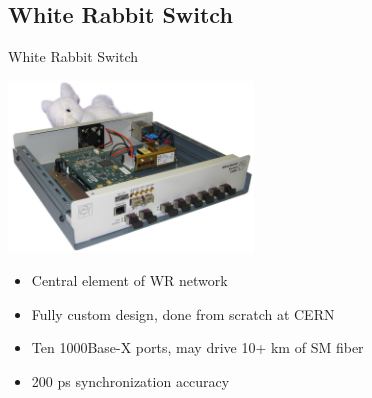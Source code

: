 \documentclass[compress,red]{beamer}
\begin{document}

\subsection {White Rabbit Switch}


\begin{frame}{White Rabbit Switch}
\begin{center}
\includegraphics[width=6.5cm]{switch/wrs2_photo.jpg}
\end{center}
\begin{itemize}
\item Central element of WR network
\item Fully custom design, done from scratch at CERN
\item Ten 1000Base-X ports, may drive 10+ km of SM fiber
\item 200 ps synchronization accuracy
\end{itemize}
\end{frame}


\end{document}
